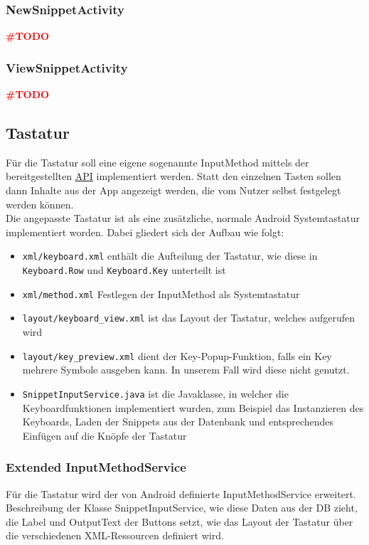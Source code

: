 \documentclass[11pt]{article}
\begin{document}
			\subsubsection{NewSnippetActivity}
				\textcolor{red}{\textbf{{\LARGE \#TODO}}}
			
			\subsubsection{ViewSnippetActivity}
				\textcolor{red}{\textbf{{\LARGE \#TODO}}}
		
		
		\subsection{Tastatur}
			\noindent Für die Tastatur soll eine eigene sogenannte InputMethod mittels der bereitgestellten \href{https://developer.android.com/guide/topics/text/creating-input-method.html}{API} implementiert werden. Statt den einzelnen Tasten sollen dann Inhalte aus der App angezeigt werden, die vom Nutzer selbst festgelegt werden können.\\
		
			\noindent Die angepasste Tastatur ist als eine zusätzliche, normale Android Systemtastatur implementiert worden. Dabei gliedert sich der Aufbau wie folgt: 
			\begin{itemize}
				\item \texttt{xml/keyboard.xml} enthält die Aufteilung der Tastatur, wie diese in \texttt{Keyboard.Row} und \texttt{Keyboard.Key} unterteilt ist
				\item \texttt{xml/method.xml} Festlegen der InputMethod als Systemtastatur
				\item \texttt{layout/keyboard\_view.xml} ist das Layout der Tastatur, welches aufgerufen wird
				\item \texttt{layout/key\_preview.xml} dient der Key-Popup-Funktion, falls ein Key mehrere Symbole ausgeben kann. In unserem Fall wird diese nicht genutzt.
				\item \texttt{SnippetInputService.java} ist die Javaklasse, in welcher die Keyboardfunktionen implementiert wurden, zum Beispiel das Instanzieren des Keyboards, Laden der Snippets aus der Datenbank und entsprechendes Einfügen auf die Knöpfe der Tastatur
			\end{itemize}
		
			\subsubsection{Extended InputMethodService}
				Für die Tastatur wird der von Android definierte InputMethodService erweitert. \\
				Beschreibung der Klasse SnippetInputService, wie diese Daten aus der DB zieht, die Label und OutputText der Buttons setzt, wie das Layout der Tastatur über die verschiedenen XML-Ressourcen definiert wird.
		
\end{document}
